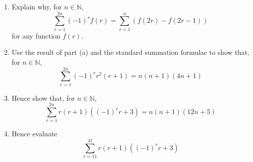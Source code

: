 \documentclass[leqno]{article}
\begin{document}
\begin{enumerate}[
  label=\textbf{\arabic*.},
  leftmargin=*,
  topsep=0pt,
  partopsep=0pt,
  parsep=0pt
]
\questionitem

\begin{enumerate}[label=\textbf{(\alph*)}]
  \item Explain why, for $n \in \mathbb{N}$,
  \[\sum_{r=1}^{2n} (-1)^r f(r) = \sum_{r=1}^{n} \left(f(2r) - f(2r-1)\right)\]
  for any function $f(r)$.  \\
  \item Use the result of part (a) and the standard summation formulae to show that, for $n \in \mathbb{N}$,
  \[\sum_{r=1}^{2n} (-1)^r r^2(r+1) = n(n+1)(4n+1)\] 
  \item Hence show that, for $n \in \mathbb{N}$,
  \[\sum_{r=1}^{2n} r(r+1)\left((-1)^r r + 3\right) = n(n+1)(12n+5)\] 
  \item Hence evaluate
  \[\sum_{r=11}^{41} r(r+1)\left((-1)^r r + 3\right)\] 
\end{enumerate}

\end{enumerate}
\end{document}
